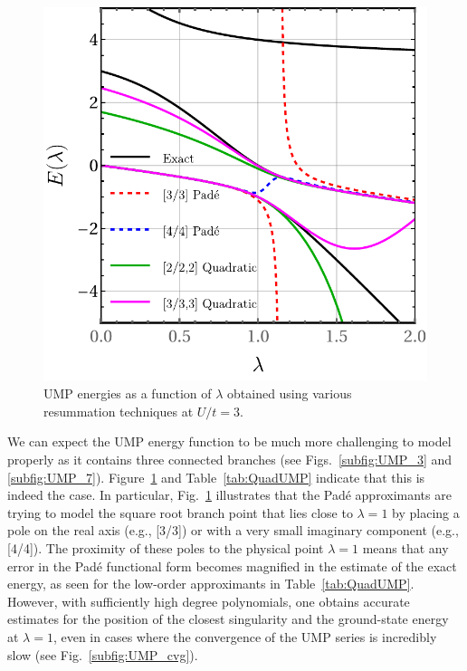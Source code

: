 \documentclass[aps,prb,reprint,noshowkeys,superscriptaddress]{revtex4-1}
\newcommand{\latin}[1]{#1}
\newcommand{\eg}{\latin{e.g.}}
\begin{document}
\begin{figure}[t]
    \includegraphics[width=\linewidth]{fig10}
    \caption{\label{fig:QuadUMP}
    UMP energies as a function of $\lambda$ obtained using various resummation techniques at $U/t = 3$.}
\end{figure}

We can expect the UMP energy function to be much more challenging 
to model properly as it contains three connected branches 
(see Figs.~\ref{subfig:UMP_3} and \ref{subfig:UMP_7}).
Figure~\ref{fig:QuadUMP} and Table~\ref{tab:QuadUMP} indicate that this is indeed the case. 
In particular, Fig.~\ref{fig:QuadUMP} illustrates that the Pad\'e approximants are trying to model
the square root branch point that lies close to $\lambda = 1$ by placing a pole on the real axis
(\eg, [3/3]) or with a very small imaginary component (\eg, [4/4]).
The proximity of these poles to the physical point $\lambda = 1$ means that any error in the Pad\'e 
functional form becomes magnified in the estimate of the exact energy, as seen for the low-order
approximants in Table~\ref{tab:QuadUMP}.
However, with sufficiently high degree polynomials, one obtains
accurate estimates for the position of the closest singularity and the ground-state energy at $\lambda = 1$,
even in cases where the convergence of the UMP series is incredibly slow 
(see Fig.~\ref{subfig:UMP_cvg}).
\end{document}
